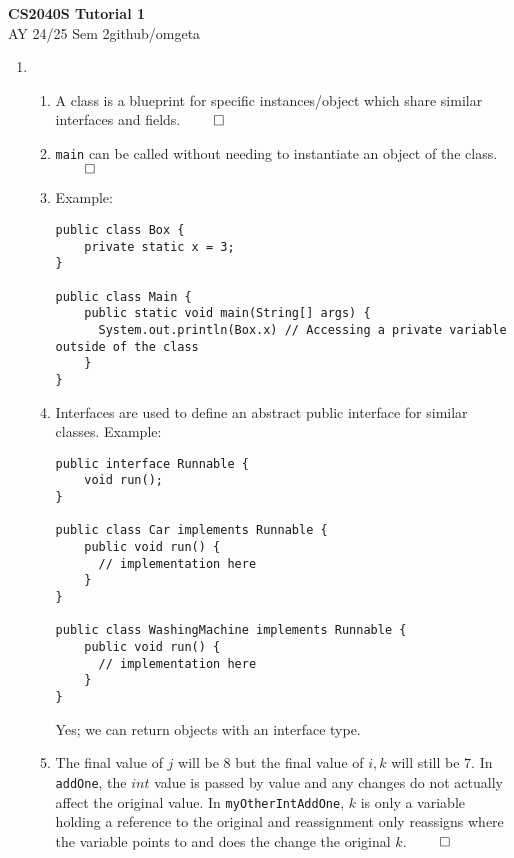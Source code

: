 \documentclass[12pt, a4paper]{article}
\newcommand{\mytitle}{CS2040S Tutorial 1}
\newcommand{\myauthor}{github/omgeta}
\newcommand{\mydate}{AY 24/25 Sem 2}
\begin{document}
\raggedright
\footnotesize
\begin{center}
{\normalsize{\textbf{\mytitle}}} \\
{\footnotesize{\mydate\hspace{2pt}\textemdash\hspace{2pt}\myauthor}}
\end{center}
\begin{enumerate}[Q\arabic*.]
  \item 
    \begin{enumerate}[(\alph*.)]
      \item A class is a blueprint for specific instances/object which share similar interfaces and fields. $\qed$

      \item \lstinline|main| can be called without needing to instantiate an object of the class. $\qed$

      \item Example: 
        \begin{lstlisting}
public class Box {
    private static x = 3;
}

public class Main {
    public static void main(String[] args) {
      System.out.println(Box.x) // Accessing a private variable outside of the class
    }
} 
        \end{lstlisting}

      \item Interfaces are used to define an abstract public interface for similar classes. Example:
        \begin{lstlisting}
public interface Runnable {
    void run();
}

public class Car implements Runnable {
    public void run() {
      // implementation here
    }
}

public class WashingMachine implements Runnable {
    public void run() {
      // implementation here
    }
}
        \end{lstlisting}
        Yes; we can return objects with an interface type.

      \item The final value of $j$ will be $8$ but the final value of $i, k$ will still be $7$. In \lstinline|addOne|, the $int$ value is passed by value and any changes do not actually affect the original value. In \lstinline|myOtherIntAddOne|, $k$ is only a variable holding a reference to the original and reassignment only reassigns where the variable points to and does the change the original $k$. $\qed$


\end{enumerate}
\end{enumerate}
\end{document}
